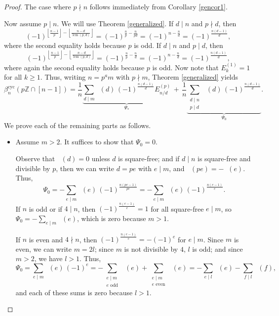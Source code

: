 \documentclass[12pt]{article}
\newcommand{\since}[1]{\tag*{\scriptsize{(#1)}}}
\newcommand{\betacyc}{\beta^{\text{cyc}}}
\DeclareMathOperator{\mob}{M\ddot{o}b}
\DeclareMathOperator{\lcm}{lcm}
\theoremstyle{definition}
\begin{document}
\begin{proof} The case where $p \nmid n$ follows immediately from Corollary \ref{gencor1}.

Now assume $p \mid n$. We will use Theorem \ref{generalized}. If $d \mid n$ and $p \nmid d$, then
\[ (-1)^{\left\lfloor\frac{n-1}{p}\right\rfloor - \left\lfloor \frac{n-d}{\lcm(p,d)}\right\rfloor} = (-1)^{\frac{n}{p} - \frac{n}{pd}} = (-1)^{n - \frac{n}{d}} = (-1)^{\frac{n(d-1)}{d}}, \]
where the second equality holds because $p$ is odd. If $d \mid n$ and $p \mid d$, then
\[ (-1)^{\left\lfloor\frac{n-1}{p}\right\rfloor - \left\lfloor \frac{n-d}{\lcm(p,d)}\right\rfloor} = (-1)^{\frac{n}{p} - \frac{n}{d}} = (-1)^{n - \frac{n}{d}} = (-1)^{\frac{n(d-1)}{d}}, \]
where again the second equality holds because $p$ is odd. Now note that $E_k^{(1)} = 1$ for all $k\ge1$. Thus, writing $n = p^a m$ with $p\nmid m$, Theorem \ref{generalized} yields
\[ \betacyc_n(p\mathbb{Z} \cap [n-1]) = \frac{1}{n} \underbrace{\sum_{\text{$d \mid m$}} \mob(d)\, (-1)^{\frac{n(d-1)}{d}}E_{n/d}^{(p)}}_{\Psi_*} \,+\, \frac{1}{n} \underbrace{\sum_{\substack{\text{$d \mid n$}\\\text{$p \mid d$}}} \mob(d)\,(-1)^{\frac{n(d-1)}{d}}}_{\Psi_0}. \]
We prove each of the remaining parts as follows.

\begin{itemize}
\item Assume $m > 2$. It suffices to show that $\Psi_0 = 0$.

Observe that $\mob(d) = 0$ unless $d$ is square-free; and if $d \mid n$ is square-free and divisible by $p$, then we can write $d = pe$ with $e \mid m$, and $\mob(pe) = -\mob(e)$. Thus,
$$\Psi_0 = -\sum_{\text{$e \mid m$}} \mob(e)\,(-1)^{\frac{n(pe-1)}{pe}} = -\sum_{\text{$e \mid m$}} \mob(e)\,(-1)^{\frac{n(e-1)}{e}}.$$ 
If $n$ is odd or if $4 \mid n$, then $(-1)^{\frac{n(e-1)}{e}} = 1$ for all square-free $e \mid m$, so $\Psi_0 = -\sum_{\text{$e \mid m$}} \mob(e)$, which is zero because $m > 1$.

If $n$ is even and $4\nmid n$, then $(-1)^{\frac{n(e-1)}{e}} = -(-1)^e$ for $e \mid m$. Since $m$ is even, we can write $m = 2l$; since $m$ is not divisible by $4$, $l$ is odd; and since $m > 2$, we have $l > 1$. Thus,
$$
\Psi_0 = \sum_{\text{$e \mid m$}} \mob(e)\,(-1)^e = -\sum_{\substack{\text{$e \mid m$}\\\text{$e$ odd}}} \mob(e) + \sum_{\substack{\text{$e \mid m$}\\\text{$e$ even}}} \mob(e) 
= -\sum_{\text{$e \mid l$}} \mob(e) - \sum_{\text{$f \mid l$}} \mob(f),$$
and each of these sums is zero because $l > 1$.


\end{itemize}
\end{proof}
\end{document}
